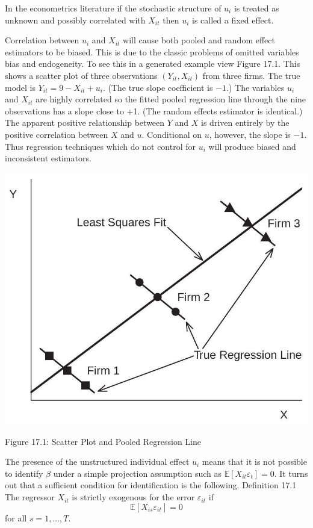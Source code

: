 \documentclass[10pt]{article}
\begin{document}
In the econometrics literature if the stochastic structure of $u_{i}$ is treated as unknown and possibly correlated with $X_{i t}$ then $u_{i}$ is called a fixed effect.

Correlation between $u_{i}$ and $X_{i t}$ will cause both pooled and random effect estimators to be biased. This is due to the classic problems of omitted variables bias and endogeneity. To see this in a generated example view Figure 17.1. This shows a scatter plot of three observations $\left(Y_{i t}, X_{i t}\right)$ from three firms. The true model is $Y_{i t}=9-X_{i t}+u_{i}$. (The true slope coefficient is $-1$.) The variables $u_{i}$ and $X_{i t}$ are highly correlated so the fitted pooled regression line through the nine observations has a slope close to +1. (The random effects estimator is identical.) The apparent positive relationship between $Y$ and $X$ is driven entirely by the positive correlation between $X$ and $u$. Conditional on $u$, however, the slope is $-1$. Thus regression techniques which do not control for $u_{i}$ will produce biased and inconsistent estimators.

\includegraphics[max width=\textwidth]{2022_10_23_acbfcce1ea7ce1901e2dg-08}

Figure 17.1: Scatter Plot and Pooled Regression Line

The presence of the unstructured individual effect $u_{i}$ means that it is not possible to identify $\beta$ under a simple projection assumption such as $\mathbb{E}\left[X_{i t} \varepsilon_{t}\right]=0$. It turns out that a sufficient condition for identification is the following. Definition 17.1 The regressor $X_{i t}$ is strictly exogenous for the error $\varepsilon_{i t}$ if
$$
\mathbb{E}\left[X_{i s} \varepsilon_{i t}\right]=0
$$
for all $s=1, \ldots, T$.
\end{document}
